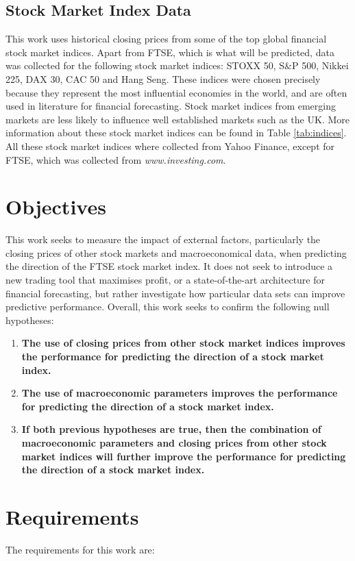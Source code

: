 \documentclass{UoYCSproject}
\begin{document}
\subsection{Stock Market Index Data}
This work uses historical closing prices from some of the top global financial stock market indices. Apart from FTSE, which is what will be predicted, data was collected for the following stock market indices: STOXX 50, S\&P 500, Nikkei 225, DAX 30, CAC 50 and Hang Seng. These indices were chosen precisely because they represent the most influential economies in the world, and are often used in literature for financial forecasting. Stock market indices from emerging markets are less likely to influence well established markets such as the UK.  More information about these stock market indices can be found in Table \ref{tab:indices}. All these stock market indices where collected from Yahoo Finance, except for FTSE, which was collected from \textit{www.investing.com}. 

\section{Objectives}
\label{sec:objectives}
This work seeks to measure the impact of external factors, particularly the closing prices of other stock markets and macroeconomical data, when predicting the direction of the FTSE stock market index. It does not seek to introduce a new trading tool that maximises profit, or a state-of-the-art architecture for financial forecasting, but rather investigate how particular data sets can improve predictive performance. Overall, this work seeks to confirm the following null hypotheses:

\begin{enumerate}
    \item \label{h1} \textbf{The use of closing prices from other stock market indices improves the performance for predicting the direction of a stock market index.}
    \item \label{h2} \textbf{The use of macroeconomic parameters improves the performance for predicting the direction of a stock market index.}
    \item \label{h3} \textbf{If both previous hypotheses are true, then the combination of macroeconomic parameters and closing prices from other stock market indices will further improve the performance for predicting the direction of a stock market index.}
\end{enumerate}

\section{Requirements}
\label{sec:requirements}
The requirements for this work are:
\end{document}
